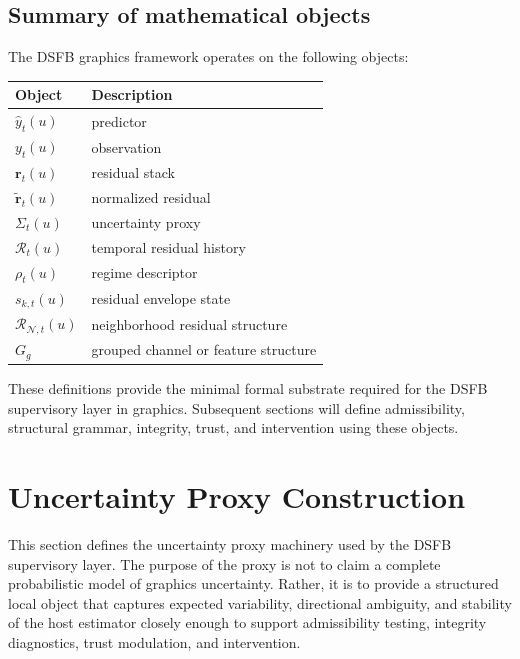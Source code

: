 \documentclass[11pt,letterpaper]{article}
\theoremstyle{gcresult}
\theoremstyle{definition}
\begin{document}
\subsection{Summary of mathematical objects}

The DSFB graphics framework operates on the following objects:
\begin{center}
\begin{tabular}{ll}
\toprule
Object & Description \\
\midrule
$\hat y_t(u)$ & predictor \\
$y_t(u)$ & observation \\
$\mathbf r_t(u)$ & residual stack \\
$\tilde{\mathbf r}_t(u)$ & normalized residual \\
$\Sigma_t(u)$ & uncertainty proxy \\
$\mathcal R_t(u)$ & temporal residual history \\
$\rho_t(u)$ & regime descriptor \\
$s_{k,t}(u)$ & residual envelope state \\
$\mathcal R_{\mathcal N,t}(u)$ & neighborhood residual structure \\
$G_g$ & grouped channel or feature structure \\
\bottomrule
\end{tabular}
\end{center}

These definitions provide the minimal formal substrate required for the DSFB supervisory layer in graphics. Subsequent sections will define admissibility, structural grammar, integrity, trust, and intervention using these objects.


\section{Uncertainty Proxy Construction}
\label{sec:proxy}

This section defines the uncertainty proxy machinery used by the DSFB supervisory layer. The purpose of the proxy is not to claim a complete probabilistic model of graphics uncertainty. Rather, it is to provide a structured local object that captures expected variability, directional ambiguity, and stability of the host estimator closely enough to support admissibility testing, integrity diagnostics, trust modulation, and intervention.
\end{document}
